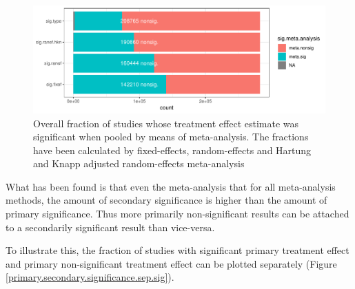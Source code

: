 \documentclass[11pt,a4paper,twoside]{book}\usepackage[]{graphicx}\usepackage[]{color}
\newenvironment{knitrout}{}{} %
\begin{document}
\begin{figure}
\begin{knitrout}
\color{fgcolor}

{\centering \includegraphics[width=\textwidth-3cm]{figure/ch02_figunnamed-chunk-13-1} 

}



\end{knitrout}
\caption{Overall fraction of studies whose treatment effect estimate was significant when pooled by means of meta-analysis. The fractions have been calculated
by fixed-effects, random-effects and Hartung and Knapp adjusted random-effects meta-analysis}
\label{primary.secondary.significance}
\end{figure}

What has been found is that even the meta-analysis that for all meta-analysis methods, the amount of secondary significance is higher than the amount of primary significance. Thus more primarily non-significant results can be attached to a secondarily significant result than vice-versa.

\vspace{0mm}
To illustrate this, the fraction of studies with significant primary treatment effect and primary non-significant treatment effect can be plotted separately (Figure \ref{primary.secondary.significance.sep.sig}). 
\end{document}
